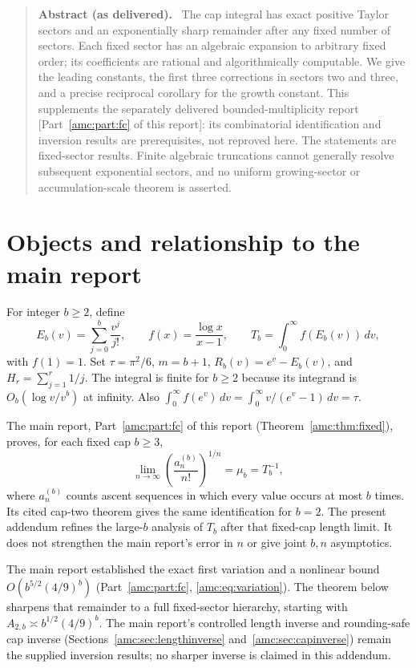 \documentclass[11pt,letterpaper]{article}
\theoremstyle{remark}\newtheorem{remark}[theorem]{Remark}
\newenvironment{partabstract}{\par\begin{quote}\small\textbf{Abstract (as delivered).}\ }{\end{quote}\par}
\begin{document}
\begin{partabstract}
The cap integral has exact positive Taylor sectors and an exponentially sharp remainder after any fixed number of sectors. Each fixed sector has an algebraic expansion to arbitrary fixed order; its coefficients are rational and algorithmically computable. We give the leading constants, the first three corrections in sectors two and three, and a precise reciprocal corollary for the growth constant. This supplements the separately delivered bounded-multiplicity report [Part~\ref{amc:part:fc} of this report]: its combinatorial identification and inversion results are prerequisites, not reproved here. The statements are fixed-sector results. Finite algebraic truncations cannot generally resolve subsequent exponential sectors, and no uniform growing-sector or accumulation-scale theorem is asserted.
\end{partabstract}

\section{Objects and relationship to the main report}\label{amc:sec:sec:objects}
For integer $b\ge2$, define
\begin{equation}\label{amc:sec:eq:objects}
 E_b(v)=\sum_{j=0}^{b}\frac{v^j}{j!},\qquad
 f(x)=\frac{\log x}{x-1},\qquad
 T_b=\int_0^\infty f(E_b(v))\,dv,
\end{equation}
with $f(1)=1$. Set $\tau=\pi^2/6$, $m=b+1$, $R_b(v)=e^v-E_b(v)$, and $H_r=\sum_{j=1}^r1/j$.
The integral is finite for $b\ge2$ because its integrand is $O_b(\log v/v^b)$ at infinity. Also
$\int_0^\infty f(e^v)\,dv=\int_0^\infty v/(e^v-1)\,dv=\tau$.

The main report, Part~\ref{amc:part:fc} of this report (Theorem~\ref{amc:thm:fixed}), proves, for each fixed cap $b\ge3$,
\[
 \lim_{n\to\infty}\left(\frac{a_n^{(b)}}{n!}\right)^{1/n}=\mu_b=T_b^{-1},
\]
where $a_n^{(b)}$ counts ascent sequences in which every value occurs at most $b$ times. Its cited cap-two theorem gives the same identification for $b=2$. The present addendum refines the large-$b$ analysis of $T_b$ after that fixed-cap length limit. It does not strengthen the main report's error in $n$ or give joint $b,n$ asymptotics.

The main report established the exact first variation and a nonlinear bound $O(b^{5/2}(4/9)^b)$ (Part~\ref{amc:part:fc}, \eqref{amc:eq:variation}). The theorem below sharpens that remainder to a full fixed-sector hierarchy, starting with $A_{2,b}\asymp b^{1/2}(4/9)^b$. The main report's controlled length inverse and rounding-safe cap inverse (Sections~\ref{amc:sec:lengthinverse} and~\ref{amc:sec:capinverse}) remain the supplied inversion results; no sharper inverse is claimed in this addendum.
\end{document}
